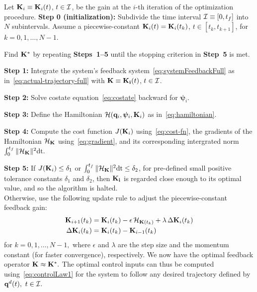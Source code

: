 \documentclass[
12pt,draftcls,onecolumn%
]{IEEEtran}
\begin{document}
Let ${\bf K}_i\equiv{\bf K}_i(t)$, $t\in {\cal I}$, be the gain at the $i$-th iteration of the optimization procedure.
\vskip6pt
\noindent
{\bf Step 0 (initialization):} Subdivide the time interval ${\cal I}\equiv [0,t_f]$ into $N$ subintervals. Assume a piecewise-constant ${\bf K}_i(t)={\bf K}_i(t_k)$, $t\in[t_k,t_{k+1}]$, for $k=0,1,\ldots,N-1.$ 

\noindent
Find ${\bf K}^*$ by repeating {\bf Steps~1--5} until the stopping criterion in {\bf Step~5} is met. 

\noindent
{\bf Step 1:} Integrate the system's feedback system~\eqref{eq:systemFeedbackFull} as in~\eqref{eq:actual-trajectory-full} with ${\bf K}\equiv{\bf K_i}(t)$, $t \in {\cal I}$.

\noindent
{\bf Step 2:} Solve costate equation~\eqref{eq:costate} backward for $\bm{\psi}_i$. 

\noindent
{\bf Step 3:} Define the Hamiltonian ${\cal H}({\bf q}_i, \bm{\psi}_i,{\bf K}_i)$ as in~\eqref{eq:hamiltonian}.

\noindent
{\bf Step 4:} Compute the cost function $J({\bf K}_i)$ using~\eqref{eq:cost-fn}, the gradients of the Hamiltonian ${\cal H}_{{\bf K}}$ using~\eqref{eq:gradient}, and its corresponding intergrated norm 
\(
\int_{0}^{t_f}\|{\cal H}_{{\bf K}}\|^2 \mathrm{dt}.
\)

\noindent
{\bf Step 5:} If $J({\bf K}_i)\leq\delta_1$ or $\int_{0}^{t_f}\|{\cal H}_{{\bf K}}\|^2 \mathrm{dt} \leq \delta_2$, for pre-defined small positive tolerance constants $\delta_1$ and $\delta_2$, then ${\bf K_i}$ is regarded close enough to its optimal value, and so the algorithm is halted.\\
Otherwise, use the following update rule to adjust the piecewise-constant feedback gain:
%
\begin{align*}
{\bf K}_{i+1}(t_k) & = {\bf K}_i(t_k) - \epsilon \thinspace {\cal H}_{{\bf K}(t_k)} + \lambda \thinspace \Delta{\bf K}_i(t_k) 
\\
\Delta{\bf K}_i(t_k) & = {\bf K}_{i}(t_k) - {\bf K}_{i-1}(t_k)
\end{align*}
%
for $k=0,1,\ldots,N-1,$ where $\epsilon$ and $\lambda$ are the step size and the momentum constant (for faster convergence), respectively. We now have the optimal feedback operator ${\bf K}\approx{\bf K}^*.$ The optimal control inputs can thus be computed using~\eqref{eq:controlLaw1} for the system to follow any desired trajectory defined by ${\bf q}^d(t),~t\in {\cal I}.$
\end{document}
